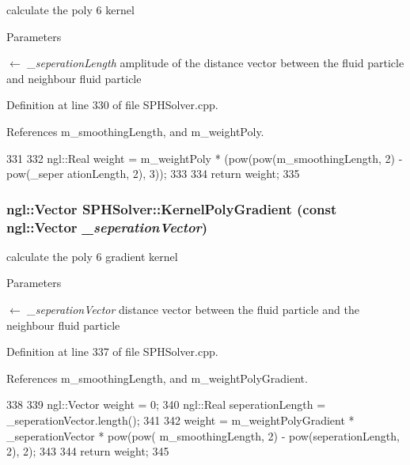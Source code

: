 calculate the poly 6 kernel 


\begin{DoxyParams}{Parameters}
\item[\mbox{$\leftarrow$} {\em \_\-seperationLength}]amplitude of the distance vector between the fluid particle and neighbour fluid particle \end{DoxyParams}


Definition at line 330 of file SPHSolver.cpp.



References m\_\-smoothingLength, and m\_\-weightPoly.




\begin{DoxyCode}
331 {
332     ngl::Real weight = m_weightPoly * (pow(pow(m_smoothingLength, 2) - pow(_seper
      ationLength, 2), 3));
333 
334     return weight;
335 }
\end{DoxyCode}


\hypertarget{class_s_p_h_solver_a2431a032b4972d7e684642e4d8c9e058}{
\subsubsection[{KernelPolyGradient}]{\setlength{\rightskip}{0pt plus 5cm}ngl::Vector SPHSolver::KernelPolyGradient (const ngl::Vector {\em \_\-seperationVector})}}
\label{class_s_p_h_solver_a2431a032b4972d7e684642e4d8c9e058}


calculate the poly 6 gradient kernel 


\begin{DoxyParams}{Parameters}
\item[\mbox{$\leftarrow$} {\em \_\-seperationVector}]distance vector between the fluid particle and the neighbour fluid particle \end{DoxyParams}


Definition at line 337 of file SPHSolver.cpp.



References m\_\-smoothingLength, and m\_\-weightPolyGradient.




\begin{DoxyCode}
338 {
339     ngl::Vector weight = 0;
340     ngl::Real seperationLength = _seperationVector.length();
341 
342     weight = m_weightPolyGradient * _seperationVector * pow(pow(
      m_smoothingLength, 2) - pow(seperationLength, 2), 2);
343 
344     return weight;
345 }
\end{DoxyCode}




